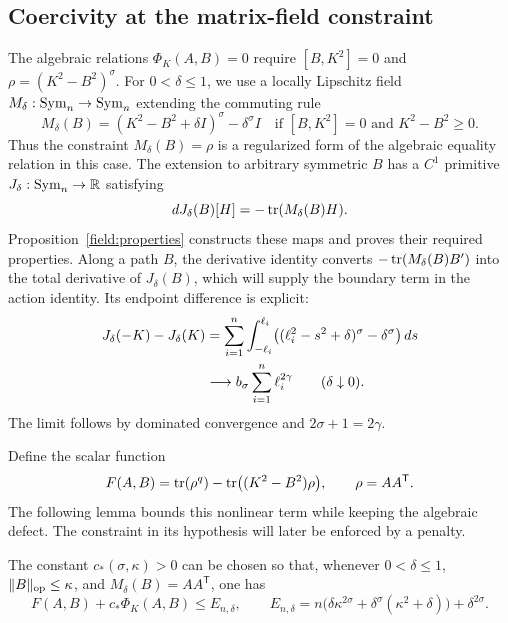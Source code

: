 \subsection{Coercivity at the matrix-field constraint}

The algebraic relations $\Phi_K(A,B)=0$ require $[B,K^2]=0$
and $\rho=(K^2-B^2)^\sigma$.  For $0<\delta\leq1$, we use a
locally Lipschitz field $M_\delta:\operatorname{Sym}_n\to\operatorname{Sym}_n$ extending
the commuting rule
\[
 M_\delta(B)=(K^2-B^2+\delta I)^\sigma-\delta^\sigma I
 \quad\text{if }[B,K^2]=0\text{ and }K^2-B^2\geq0.
\]
Thus the constraint $M_\delta(B)=\rho$ is a regularized form of
the algebraic equality relation in this case.  The extension to
arbitrary symmetric $B$ has a $C^1$ primitive
$J_\delta:\operatorname{Sym}_n\to\mathbb R$ satisfying
\begin{equation}\label{act:primitive}
 dJ_\delta(B)[H]=-\operatorname{tr}(M_\delta(B)H).
\end{equation}
Proposition~\ref{field:properties} constructs these maps and proves
their required properties.  Along a path $B$, the derivative identity
converts $-\operatorname{tr}(M_\delta(B)B')$ into the total derivative of
$J_\delta(B)$, which will supply the boundary term in the action
identity.
Its endpoint difference is explicit:
\begin{align}
 J_\delta(-K)-J_\delta(K)
 &=\sum_{i=1}^n\int_{-\ell_i}^{\ell_i}
     \bigl((\ell_i^2-s^2+\delta)^\sigma-\delta^\sigma\bigr)\,ds
       \notag\\
 &\longrightarrow b_\sigma\sum_{i=1}^n\ell_i^{2\gamma}
       \qquad(\delta\downarrow0).
       \label{act:endpoints}
\end{align}
The limit follows by dominated convergence and
$2\sigma+1=2\gamma$.

Define the scalar function
\begin{equation}\label{act:F}
 F(A,B)=\operatorname{tr}(\rho^q)-\operatorname{tr}\bigl((K^2-B^2)\rho\bigr),
 \qquad \rho=AA^{\mathsf T}.
\end{equation}
The following lemma bounds this nonlinear term while keeping the
algebraic defect.  The constraint in its hypothesis will later be
enforced by a penalty.

\begin{lemma}\label{act:constraint}
The constant $c_*(\sigma,\kappa)>0$ can be chosen so that, whenever
$0<\delta\leq1$, $\|B\|_{\operatorname{op}}\leq\kappa$, and
$M_\delta(B)=AA^{\mathsf T}$, one has
\begin{equation}\label{act:constraint-bound}
 F(A,B)+c_*\Phi_K(A,B)\leq E_{n,\delta},
 \qquad
 E_{n,\delta}
 =n\bigl(\delta\kappa^{2\sigma}
           +\delta^\sigma(\kappa^2+\delta)\bigr)
      +\delta^{2\sigma}.
\end{equation}
\end{lemma}

